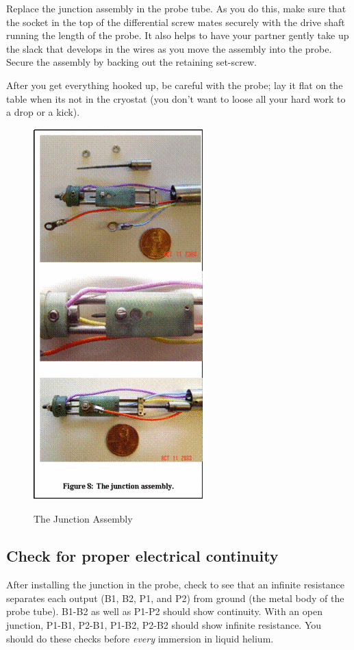 \documentclass{../lab}
\begin{document}
Replace the junction assembly in the probe tube. As you do this, make sure that the socket in the top of the differential screw mates securely with the drive shaft running the length of the probe. It also helps to have your partner gently take up the slack that develops in the wires as you move the assembly into the probe. Secure the assembly by backing out the retaining set-screw.

After you get everything hooked up, be careful with the probe; lay it flat on the table when its not in the cryostat (you don't want to loose all your hard work to a drop or a kick).

\begin{figure}[h]
    \centering
    \href{http://experimentationlab.berkeley.edu/sites/default/files/images/250px-JOS13.gif}{\includegraphics[width=0.3\linewidth]{images/250px-JOS13.png}}
    \caption{The Junction Assembly}
    \label{fig:JunctionAssembly}
\end{figure}

\subsection{Check for proper electrical continuity}

After installing the junction in the probe, check to see that an infinite resistance separates each output (B1, B2, P1, and P2) from ground (the metal body of the probe tube). B1-B2 as well as P1-P2 should show continuity. With an open junction, P1-B1, P2-B1, P1-B2, P2-B2 should show infinite resistance. You should do these checks before \emph{every} immersion in liquid helium.
\end{document}
